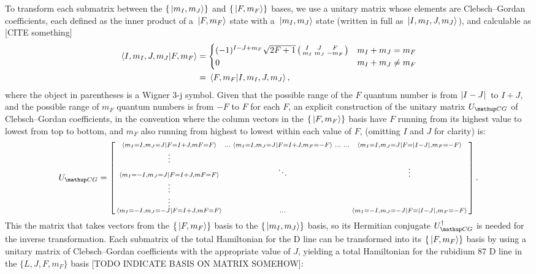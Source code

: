 To transform each submatrix between the $\{\ket{m_I, m_J}\}$ and $\{\ket{F, m_F}\}$ bases, we use a unitary matrix whose elements are Clebsch--Gordan coefficients, each defined as the inner product of a $\ket{F, m_F}$ state with a $\ket{m_I, m_J}$ state (written in full as $\ket{I, m_I, J, m_J}$), and calculable as [CITE something]
\begin{align}\label{eq:ClebschGordanCoeffs}
\braket{I, m_I, J, m_J}{F, m_F} &= \begin{cases}
(-1)^{I - J + m_F}\sqrt{2F + 1}
\left(\begin{smallmatrix}
I & J & F\\
m_I & m_J & -m_F\\
\end{smallmatrix}\right) & m_I + m_J = m_F\\
0 & m_I + m_J \neq m_F
\end{cases}\nonumber\\
&= \braket{F, m_F}{I, m_I, J, m_J},
\end{align}
where the object in parentheses is a Wigner $3$-j symbol. Given that the possible range of the $F$ quantum number is from $\abs{I - J}$ to $I + J$, and the possible range of $m_F$ quantum numbers is from $-F$ to $F$ for each $F$, an explicit construction of the unitary matrix $U_\up{CG}$ of Clebsch--Gordan coefficients, in the convention where the column vectors in the $\{\ket{F, m_F}\}$ basis have $F$ running from its highest value to lowest from top to bottom, and $m_F$ also running from highest to lowest within each value of $F$, (omitting $I$ and $J$ for clarity) is:
\begin{align}
U_\up{CG} = \left[\begin{smallmatrix}
\braket{m_I=I, m_J=J}{F=I+J, mF=F} & \hdots &
\braket{m_I=I, m_J=J}{F=I+J, m_F=-F} & \hdots &\hdots &
\braket{m_I=I, m_J=J}{F=\abs{I - J}, m_F=-F}\\
\vdots\\
\braket{m_I=-I, m_J=J}{F=I+J, mF=F} & & \ddots & & & \vdots\\
\vdots\\
\vdots\\
\braket{m_I=-I, m_J=-J}{F=I+J, mF=F} & & \hdots & & &
\braket{m_I=-I, m_J=-J}{F=\abs{I - J}, m_F=-F}\\
\end{smallmatrix}\right].
\end{align}
This the matrix that takes vectors from the $\{\ket{F, m_F}\}$ basis to the $\{\ket{m_I, m_J}\}$ basis, so its Hermitian conjugate $U^\dagger_\up{CG}$ is needed for the inverse transformation. Each submatrix of the total Hamiltonian for the D line can be transformed into its $\{\ket{F, m_F}\}$ basis by using a unitary matrix of Clebsch--Gordan coefficients with the appropriate value of $J$, yielding a total Hamiltonian for the rubidium 87 D line in the $\{L, J, F, m_F\}$ basis [TODO INDICATE BASIS ON MATRIX SOMEHOW]:
